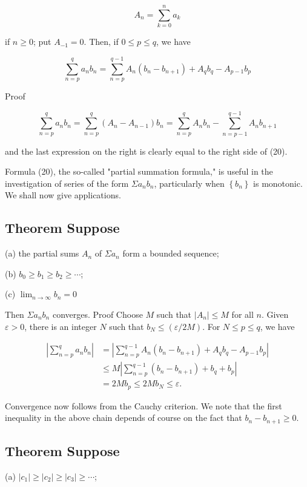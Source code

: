 \documentclass[10pt]{article}
\begin{document}
$$
A_{n}=\sum_{k=0}^{n} a_{k}
$$

if $n \geq 0$; put $A_{-1}=0$. Then, if $0 \leq p \leq q$, we have

$$
\sum_{n=p}^{q} a_{n} b_{n}=\sum_{n=p}^{q-1} A_{n}\left(b_{n}-b_{n+1}\right)+A_{q} b_{q}-A_{p-1} b_{p}
$$

Proof

$$
\sum_{n=p}^{q} a_{n} b_{n}=\sum_{n=p}^{q}\left(A_{n}-A_{n-1}\right) b_{n}=\sum_{n=p}^{q} A_{n} b_{n}-\sum_{n=p-1}^{q-1} A_{n} b_{n+1}
$$

and the last expression on the right is clearly equal to the right side of (20).

Formula (20), the so-called "partial summation formula," is useful in the investigation of series of the form $\Sigma a_{n} b_{n}$, particularly when $\left\{b_{n}\right\}$ is monotonic. We shall now give applications.

\subsection{Theorem Suppose}
(a) the partial sums $A_{n}$ of $\Sigma a_{n}$ form a bounded sequence;

(b) $b_{0} \geq b_{1} \geq b_{2} \geq \cdots$;

(c) $\lim _{n \rightarrow \infty} b_{n}=0$

Then $\Sigma a_{n} b_{n}$ converges. Proof Choose $M$ such that $\left|A_{n}\right| \leq M$ for all $n$. Given $\varepsilon>0$, there is an integer $N$ such that $b_{N} \leq(\varepsilon / 2 M)$. For $N \leq p \leq q$, we have

$$
\begin{aligned}
\left|\sum_{n=p}^{q} a_{n} b_{n}\right| & =\left|\sum_{n=p}^{q-1} A_{n}\left(b_{n}-b_{n+1}\right)+A_{q} b_{q}-A_{p-1} b_{p}\right| \\
& \leq M\left|\sum_{n=p}^{q-1}\left(b_{n}-b_{n+1}\right)+b_{q}+b_{p}\right| \\
& =2 M b_{p} \leq 2 M b_{N} \leq \varepsilon .
\end{aligned}
$$

Convergence now follows from the Cauchy criterion. We note that the first inequality in the above chain depends of course on the fact that $b_{n}-b_{n+1} \geq 0$.

\subsection{Theorem Suppose}
(a) $\left|c_{1}\right| \geq\left|c_{2}\right| \geq\left|c_{3}\right| \geq \cdots$;
\end{document}
